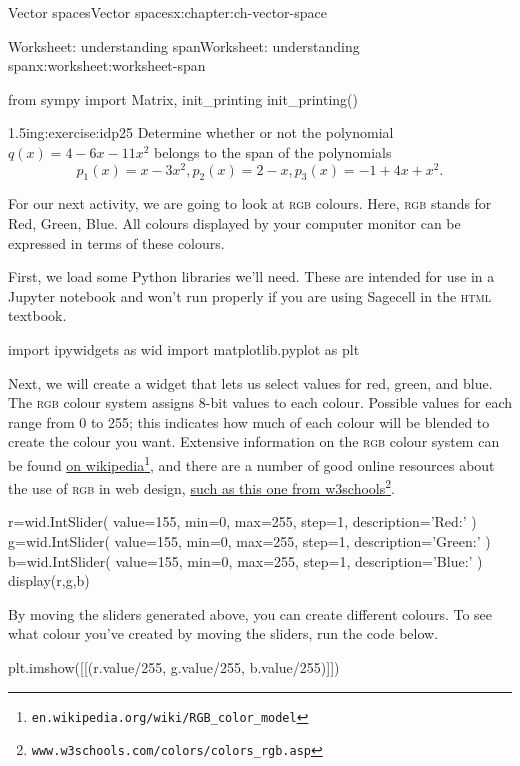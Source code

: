 \documentclass[oneside,10pt,]{book}
\newcommand{\initialism}[1]{\textsc{\MakeLowercase{#1}}}
\numberwithin{equation}{section}
\begin{document}
\begin{chapterptx}{Vector spaces}{}{Vector spaces}{}{}{x:chapter:ch-vector-space}
\begin{worksheet-section}{Worksheet: understanding span}{}{Worksheet: understanding span}{}{}{x:worksheet:worksheet-span}
\begin{sageinput}
from sympy import Matrix, init_printing
init_printing()
\end{sageinput}
\begin{divisionexercise}{2}{}{1.5in}{g:exercise:idp25}%
Determine whether or not the polynomial \(q(x) = 4-6x-11x^2\) belongs to the span of the polynomials%
\begin{equation*}
p_1(x) = x-3x^2, p_2(x)=2-x, p_3(x) = -1+4x+x^2\text{.}
\end{equation*}
%
\end{divisionexercise}%
%
\clearpage
For our next activity, we are going to look at \initialism{RGB} colours. Here, \initialism{RGB} stands for Red, Green, Blue. All colours displayed by your computer monitor can be expressed in terms of these colours.%
\par
First, we load some Python libraries we'll need. These are intended for use in a Jupyter notebook and won't run properly if you are using Sagecell in the \initialism{HTML} textbook.%
\begin{sageinput}
import ipywidgets as wid
import matplotlib.pyplot as plt
\end{sageinput}
Next, we will create a widget that lets us select values for red, green, and blue. The \initialism{RGB} colour system assigns 8-bit values to each colour. Possible values for each range from 0 to 255; this indicates how much of each colour will be blended to create the colour you want. Extensive information on the \initialism{RGB} colour system can be found \href{https://en.wikipedia.org/wiki/RGB_color_model}{on wikipedia}\footnote{\nolinkurl{en.wikipedia.org/wiki/RGB_color_model}\label{g:fn:idp26}}, and there are a number of good online resources about the use of \initialism{RGB} in web design, \href{https://www.w3schools.com/colors/colors_rgb.asp}{such as this one from w3schools}\footnote{\nolinkurl{www.w3schools.com/colors/colors_rgb.asp}\label{g:fn:idp27}}.%
\begin{sageinput}
r=wid.IntSlider(
    value=155,
    min=0,
    max=255,
    step=1,
    description='Red:'
)
g=wid.IntSlider(
    value=155,
    min=0,
    max=255,
    step=1,
    description='Green:'
)
b=wid.IntSlider(
    value=155,
    min=0,
    max=255,
    step=1,
    description='Blue:'
)
display(r,g,b)
\end{sageinput}
By moving the sliders generated above, you can create different colours. To see what colour you've created by moving the sliders, run the code below.%
\begin{sageinput}
plt.imshow([[(r.value/255, g.value/255, b.value/255)]])

\end{sageinput}
\end{worksheet-section}
\end{chapterptx}
\end{document}
